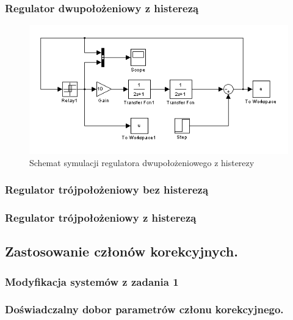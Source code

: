\documentclass[a4paper,10pt]{article}
\begin{document}
\subsubsection{Regulator dwupołożeniowy z histerezą}\label{sec:r2h}
\begin{figure}[h]
    \centering
	\includegraphics[width=120mm]{CW3-schemat-2z.png}
	\caption{Schemat symulacji regulatora dwupołożeniowego z histerezy}
    \label{fig:Rysunek}
\end{figure}

\subsubsection{Regulator trójpołożeniowy bez histerezą}\label{sec:r3bh}

\subsubsection{Regulator trójpołożeniowy z histerezą}\label{sec:r3h}
\subsection{Zastosowanie członów korekcyjnych.}\label{sec:zad2}
\subsubsection{Modyfikacja systemów z zadania 1}\label{sec:zad2_1}
\subsubsection{Doświadczalny dobor parametrów członu korekcyjnego.}\label{sec:zad2_2}
\end{document}
